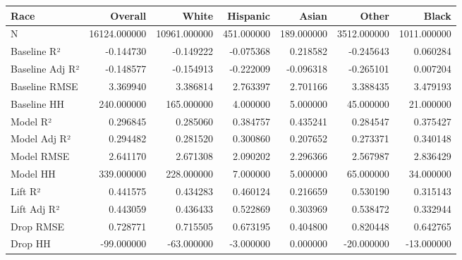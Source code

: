 \begin{tabular}{lrrrrrr}
\toprule
Race &       Overall &         White &    Hispanic &       Asian &        Other &        Black \\
\midrule
N               &  16124.000000 &  10961.000000 &  451.000000 &  189.000000 &  3512.000000 &  1011.000000 \\
Baseline R²     &     -0.144730 &     -0.149222 &   -0.075368 &    0.218582 &    -0.245643 &     0.060284 \\
Baseline Adj R² &     -0.148577 &     -0.154913 &   -0.222009 &   -0.096318 &    -0.265101 &     0.007204 \\
Baseline RMSE   &      3.369940 &      3.386814 &    2.763397 &    2.701166 &     3.388435 &     3.479193 \\
Baseline HH     &    240.000000 &    165.000000 &    4.000000 &    5.000000 &    45.000000 &    21.000000 \\
Model R²        &      0.296845 &      0.285060 &    0.384757 &    0.435241 &     0.284547 &     0.375427 \\
Model Adj R²    &      0.294482 &      0.281520 &    0.300860 &    0.207652 &     0.273371 &     0.340148 \\
Model RMSE      &      2.641170 &      2.671308 &    2.090202 &    2.296366 &     2.567987 &     2.836429 \\
Model HH        &    339.000000 &    228.000000 &    7.000000 &    5.000000 &    65.000000 &    34.000000 \\
Lift R²         &      0.441575 &      0.434283 &    0.460124 &    0.216659 &     0.530190 &     0.315143 \\
Lift Adj R²     &      0.443059 &      0.436433 &    0.522869 &    0.303969 &     0.538472 &     0.332944 \\
Drop RMSE       &      0.728771 &      0.715505 &    0.673195 &    0.404800 &     0.820448 &     0.642765 \\
Drop HH         &    -99.000000 &    -63.000000 &   -3.000000 &    0.000000 &   -20.000000 &   -13.000000 \\
\bottomrule
\end{tabular}
